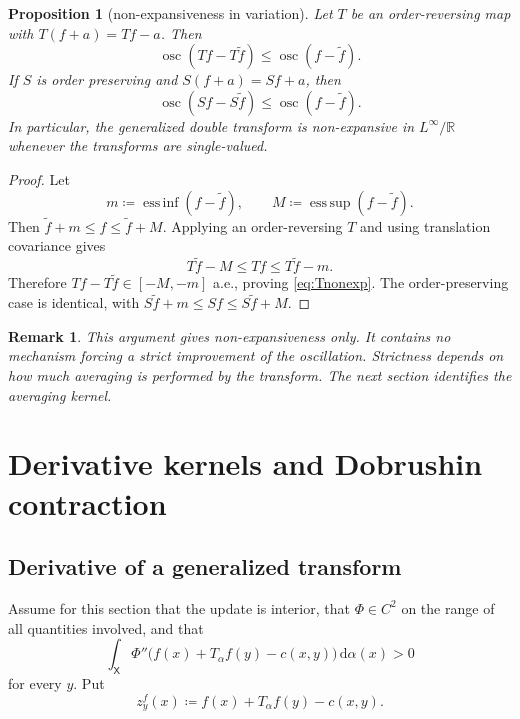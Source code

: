 \documentclass[11pt]{article}
\newtheorem{proposition}[theorem]{Proposition}
\newtheorem{remark}[theorem]{Remark}
\newcommand{\R}{\mathbb{R}}
\newcommand{\X}{\mathsf{X}}
\newcommand{\dd}{\,\mathrm{d}}
\newcommand{\osc}{\operatorname{osc}}
\newcommand{\esssup}{\operatorname*{ess\,sup}}
\newcommand{\essinf}{\operatorname*{ess\,inf}}
\newcommand{\defeq}{\coloneqq}
\begin{document}
\begin{proposition}[non-expansiveness in variation]\label{prop:nonexp}
Let $T$ be an order-reversing map with $T(f+a)=Tf-a$.  Then
\begin{equation}\label{eq:Tnonexp}
  \osc(Tf-T\tilde f)\leq \osc(f-\tilde f).
\end{equation}
If $S$ is order preserving and $S(f+a)=Sf+a$, then
\begin{equation}\label{eq:Snonexp}
  \osc(Sf-S\tilde f)\leq \osc(f-\tilde f).
\end{equation}
In particular, the generalized double transform is non-expansive in
$L^\infty/\R$ whenever the transforms are single-valued.
\end{proposition}

\begin{proof}
Let
\begin{equation*}
  m\defeq \essinf(f-\tilde f),
  \qquad
  M\defeq \esssup(f-\tilde f).
\end{equation*}
Then $\tilde f+m\leq f\leq \tilde f+M$.  Applying an order-reversing $T$ and
using translation covariance gives
\begin{equation*}
  T\tilde f-M\leq Tf\leq T\tilde f-m.
\end{equation*}
Therefore $Tf-T\tilde f\in[-M,-m]$ a.e., proving \eqref{eq:Tnonexp}.  The
order-preserving case is identical, with
$S\tilde f+m\leq Sf\leq S\tilde f+M$.
\end{proof}

\begin{remark}
This argument gives non-expansiveness only.  It contains no mechanism forcing a
strict improvement of the oscillation.  Strictness depends on how much averaging
is performed by the transform.  The next section identifies the averaging
kernel.
\end{remark}

\section{Derivative kernels and Dobrushin contraction}\label{sec:derivative}

\subsection{Derivative of a generalized transform}

Assume for this section that the update is interior, that $\Phi\in C^2$ on the
range of all quantities involved, and that
\begin{equation*}
  \int_\X \Phi''\big(f(x)+T_\alpha f(y)-c(x,y)\big)\dd\alpha(x)>0
\end{equation*}
for every $y$.  Put
\begin{equation}\label{eq:zy}
  z_y^f(x)
  \defeq f(x)+T_\alpha f(y)-c(x,y).
\end{equation}
\end{document}
